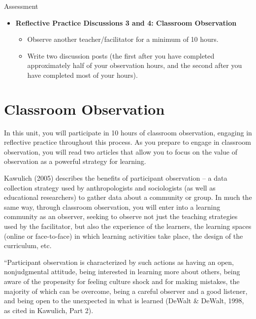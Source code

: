 \documentclass[
]{book}
\providecommand{\tightlist}{%
  \setlength{\itemsep}{0pt}\setlength{\parskip}{0pt}}
\begin{document}
\begin{assessment}
{Assessment}

\begin{itemize}
\tightlist
\item
  \textbf{Reflective Practice Discussions 3 and 4: Classroom Observation}

  \begin{itemize}
  \tightlist
  \item
    Observe another teacher/facilitator for a minimum of 10 hours.\\
  \item
    Write two discussion posts (the first after you have completed approximately half of your observation hours, and the second after you have completed most of your hours).
  \end{itemize}
\end{itemize}
\end{assessment}

\hypertarget{classroom-observation-1}{%
\section{Classroom Observation}\label{classroom-observation-1}}

In this unit, you will participate in 10 hours of classroom observation, engaging in reflective practice throughout this process. As you prepare to engage in classroom observation, you will read two articles that allow you to focus on the value of observation as a powerful strategy for learning.

Kawulich (2005) describes the benefits of participant observation -- a data collection strategy used by anthropologists and sociologists (as well as educational researchers) to gather data about a community or group. In much the same way, through classroom observation, you will enter into a learning community as an observer, seeking to observe not just the teaching strategies used by the facilitator, but also the experience of the learners, the learning spaces (online or face-to-face) in which learning activities take place, the design of the curriculum, etc.

``Participant observation is characterized by such actions as having an open, nonjudgmental attitude, being interested in learning more about others, being aware of the propensity for feeling culture shock and for making mistakes, the majority of which can be overcome, being a careful observer and a good listener, and being open to the unexpected in what is learned (DeWalt \& DeWalt, 1998, as cited in Kawulich, Part 2).
\end{document}
